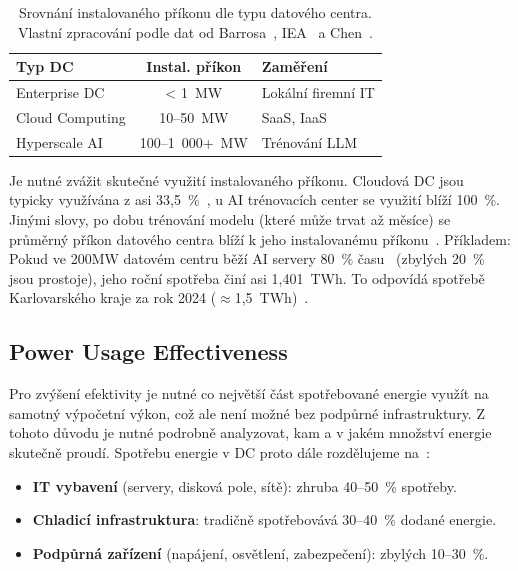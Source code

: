 \begin{table}[t] \centering

    \begin{tabular}{lcl}
        \toprule
        \textbf{Typ DC} & \textbf{Instal. příkon} & \textbf{Zaměření} \\
        \midrule
        Enterprise DC & < 1~MW & Lokální firemní IT \\
        Cloud Computing & 10--50~MW & SaaS, IaaS \\
        Hyperscale AI & 100--1~000+~MW & Trénování LLM \\
        \bottomrule
    \end{tabular}

    \caption[Srovnání instalovaného příkonu]{Srovnání instalovaného příkonu dle typu datového centra. Vlastní zpracování podle dat od Barrosa~\cite{barroso_data_2026}, IEA~\cite{international_energy_agency_iea_energy_2025} a Chen~\cite{chen_electricity_2025}.}
    \label{tab:energeticke_rozsahy}

\end{table}

Je nutné zvážit skutečné využití instalovaného příkonu. Cloudová DC jsou typicky využívána z asi 33,5~\%~\cite[s.~224]{barroso_data_2026}, u AI trénovacích center se využití blíží 100~\%. Jinými slovy, po dobu trénování modelu (které může trvat až měsíce) se průměrný příkon datového centra blíží k jeho instalovanému příkonu~\cite[s.~3]{avelar_ai_2023}. Příkladem: Pokud ve 200MW datovém centru běží AI servery 80~\% času~\cite[s.~27]{LBNL-2001637} (zbylých 20~\% jsou prostoje), jeho roční spotřeba činí asi 1,401~TWh. To odpovídá spotřebě Karlovarského kraje za rok 2024 ($\approx$1,5~TWh)~\cite{energeticky_regulacni_urad_spotreba_2024}.

\subsection{Power Usage Effectiveness}
\label{subsec:pue}

Pro zvýšení efektivity je nutné co největší část spotřebované energie využít na samotný výpočetní výkon, což ale není možné bez podpůrné infrastruktury. Z tohoto důvodu je nutné podrobně analyzovat, kam a v jakém množství energie skutečně proudí. Spotřebu energie v DC proto dále rozdělujeme na~\cite{chen_electricity_2025, sheng_power_2026}:

\begin{itemize}
    \item \textbf{IT vybavení} (servery, disková pole, sítě): zhruba 40--50~\% spotřeby.

    \item \textbf{Chladicí infrastruktura}: tradičně spotřebovává 30--40~\% dodané energie.

    \item \textbf{Podpůrná zařízení} (napájení, osvětlení, zabezpečení): zbylých 10--30~\%.
\end{itemize}
 
